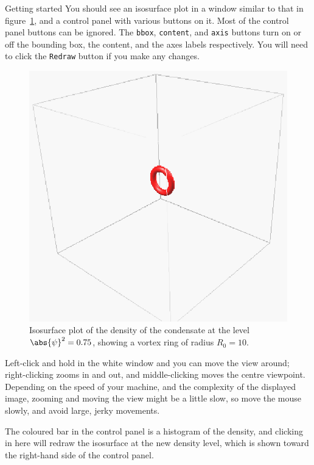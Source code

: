 \begin{chapter}{\label{cha:quickstart}Getting started}
  You should see an isosurface plot in a window similar to that in
  figure~\ref{fig:ring_ic_iso}, and a control panel with various buttons on it.
  Most of the control panel buttons can be ignored.  The \verb"bbox",
  \verb"content", and \verb"axis" buttons turn on or off the bounding box, the
  content, and the axes labels respectively.  You will need to click the
  \verb"Redraw" button if you make any changes.
  \begin{figure}[h]
    \centering
    \includegraphics[scale=1]{fig/ring_ic_iso}
    \caption{\label{fig:ring_ic_iso}Isosurface plot of the density of the
      condensate at the level $\abs{\psi}^{2} = 0.75$, showing a vortex ring of
      radius $R_{0}=10$.}
  \end{figure}
  Left-click and hold in the white window and you can move the view around;
  right-clicking zooms in and out, and middle-clicking moves the centre
  viewpoint.  Depending on the speed of your machine, and the complexity of the
  displayed image, zooming and moving the view might be a little slow, so move
  the mouse slowly, and avoid large, jerky movements.

  The coloured bar in the control panel is a histogram of the density, and
  clicking in here will redraw the isosurface at the new density level, which
  is shown toward the right-hand side of the control panel.


\end{chapter}

